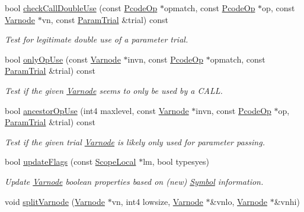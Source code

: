 \begin{DoxyCompactItemize}
bool \mbox{\hyperlink{class_funcdata_add076d930ec2ceb66453451e478ca7d4}{check\+Call\+Double\+Use}} (const \mbox{\hyperlink{class_pcode_op}{Pcode\+Op}} $\ast$opmatch, const \mbox{\hyperlink{class_pcode_op}{Pcode\+Op}} $\ast$op, const \mbox{\hyperlink{class_varnode}{Varnode}} $\ast$vn, const \mbox{\hyperlink{class_param_trial}{Param\+Trial}} \&trial) const
\begin{DoxyCompactList}\small\item\em Test for legitimate double use of a parameter trial. \end{DoxyCompactList}\item 
bool \mbox{\hyperlink{class_funcdata_a07ddc6cd232b4a101968d960fda9b965}{only\+Op\+Use}} (const \mbox{\hyperlink{class_varnode}{Varnode}} $\ast$invn, const \mbox{\hyperlink{class_pcode_op}{Pcode\+Op}} $\ast$opmatch, const \mbox{\hyperlink{class_param_trial}{Param\+Trial}} \&trial) const
\begin{DoxyCompactList}\small\item\em Test if the given \mbox{\hyperlink{class_varnode}{Varnode}} seems to only be used by a C\+A\+LL. \end{DoxyCompactList}\item 
bool \mbox{\hyperlink{class_funcdata_adfa02a817ac34b428cac2a327d1891c0}{ancestor\+Op\+Use}} (int4 maxlevel, const \mbox{\hyperlink{class_varnode}{Varnode}} $\ast$invn, const \mbox{\hyperlink{class_pcode_op}{Pcode\+Op}} $\ast$op, \mbox{\hyperlink{class_param_trial}{Param\+Trial}} \&trial) const
\begin{DoxyCompactList}\small\item\em Test if the given trial \mbox{\hyperlink{class_varnode}{Varnode}} is likely only used for parameter passing. \end{DoxyCompactList}\item 
bool \mbox{\hyperlink{class_funcdata_ae24d203d78d38285de2c4c8b14074769}{update\+Flags}} (const \mbox{\hyperlink{class_scope_local}{Scope\+Local}} $\ast$lm, bool typesyes)
\begin{DoxyCompactList}\small\item\em Update \mbox{\hyperlink{class_varnode}{Varnode}} boolean properties based on (new) \mbox{\hyperlink{class_symbol}{Symbol}} information. \end{DoxyCompactList}\item 
void \mbox{\hyperlink{class_funcdata_a5acffbbc08461b91111ef9c943a9222f}{split\+Varnode}} (\mbox{\hyperlink{class_varnode}{Varnode}} $\ast$vn, int4 lowsize, \mbox{\hyperlink{class_varnode}{Varnode}} $\ast$\&vnlo, \mbox{\hyperlink{class_varnode}{Varnode}} $\ast$\&vnhi)

\end{DoxyCompactItemize}
